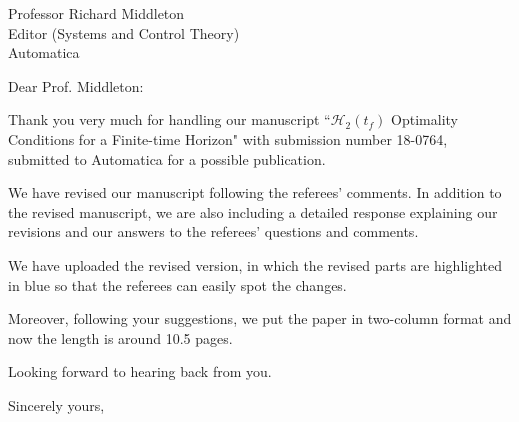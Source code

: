 \documentclass[11pt]{letter}
\begin{document}
\begin{letter} {Professor Richard Middleton\\
Editor (Systems and Control Theory) \\
Automatica
 }
 
 \signature{ 
Klajdi Sinani \\
}

 \opening{Dear  Prof. Middleton:}
 
 Thank you very much for handling our manuscript ``$\mathcal{H}_2(t_f)$ Optimality Conditions for a Finite-time Horizon"  with submission number 18-0764, submitted to Automatica for a possible publication.

We have revised our manuscript following the referees' comments. In addition to the revised manuscript, we are also including a detailed response explaining our revisions and our answers to the referees' questions and comments.

We have uploaded the revised version, in which the revised parts are highlighted in blue so that the referees can easily spot the changes.

Moreover, following your suggestions, we put the paper in two-column format and now the length is around 10.5 pages. 

Looking forward to hearing back from you.


 
\vspace{1.0cm}

\closing{Sincerely yours,}

\end{letter} 




 
 
\end{document}

